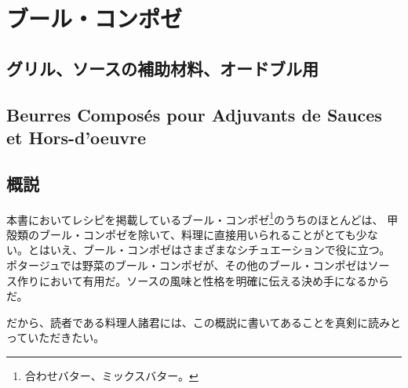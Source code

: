 \hypertarget{ux30d6ux30fcux30ebux30b3ux30f3ux30ddux30bc}{%
\section{ブール・コンポゼ}\label{ux30d6ux30fcux30ebux30b3ux30f3ux30ddux30bc}}

\vspace{0\zw}

\hypertarget{ux30b0ux30eaux30ebux30bdux30fcux30b9ux306eux88dcux52a9ux6750ux6599ux30aaux30fcux30c9ux30d6ux30ebux7528}{%
\subsection{グリル、ソースの補助材料、オードブル用}\label{ux30b0ux30eaux30ebux30bdux30fcux30b9ux306eux88dcux52a9ux6750ux6599ux30aaux30fcux30c9ux30d6ux30ebux7528}}

\vspace*{-1.5\zw}

\hypertarget{beurres-composuxe9s-pour-adjuvants-de-sauces-et-hors-doeuvre}{%
\subsection{Beurres Composés pour Adjuvants de Sauces et
Hors-d'oeuvre}\label{beurres-composuxe9s-pour-adjuvants-de-sauces-et-hors-doeuvre}}


\hypertarget{ux6982ux8aac}{%
\subsection{概説}\label{ux6982ux8aac}}

本書においてレシピを掲載しているブール・コンポゼ\footnote{合わせバター、ミックスバター。}のうちのほとんどは、
甲殻類のブール・コンポゼを除いて、料理に直接用いられることがとても少な
い。とはいえ、ブール・コンポゼはさまざまなシチュエーションで役に立つ。
ポタージュでは野菜のブール・コンポゼが、その他のブール・コンポゼはソー
ス作りにおいて有用だ。ソースの風味と性格を明確に伝える決め手になるから
だ。

だから、読者である料理人諸君には、この概説に書いてあることを真剣に読みとっていただきたい。
\href{原文における内容矛盾。この後のパラグラフは甲殻類のバターについての注意点ばかりが目立つ}{}

